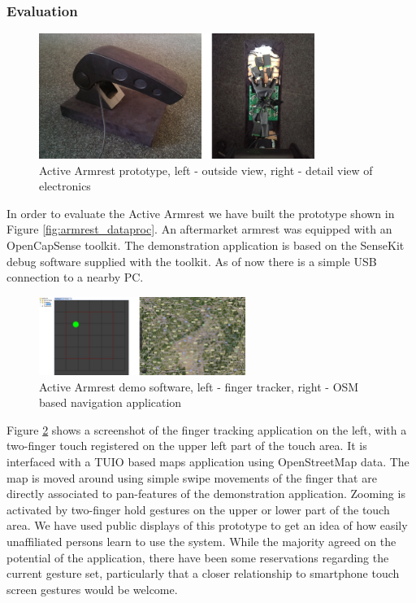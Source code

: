 \subsubsection{Evaluation}
\begin{figure}[h]
\centering
\includegraphics[width=0.8\textwidth]{images/armrest_proto}
\caption{Active Armrest prototype, left - outside view, right - detail view of electronics}
\label{fig:armrest_proto}
\end{figure}
In order to evaluate the Active Armrest we have built the prototype shown in Figure \ref{fig:armrest_dataproc}. An aftermarket armrest was equipped with an OpenCapSense toolkit. The demonstration application is based on the SenseKit debug software supplied with the toolkit. As of now there is a simple USB connection to a nearby PC.
\begin{figure}[h]
\centering
\includegraphics[width=0.6\textwidth]{images/armrest_eval}
\caption{Active Armrest demo software, left - finger tracker, right - OSM based navigation application}
\label{fig:armrest_eval}
\end{figure}
Figure \ref{fig:armrest_eval} shows a screenshot of the finger tracking application on the left, with a two-finger touch registered on the upper left part of the touch area. It is interfaced with a TUIO \cite{kaltenbrunner2005tuio} based maps application using OpenStreetMap \cite{haklay2008openstreetmap} data. The map is moved around using simple swipe movements of the finger that are directly associated to pan-features of the demonstration application. Zooming is activated by two-finger hold gestures on the upper or lower part of the touch area. We have used public displays of this prototype to get an idea of how easily unaffiliated persons learn to use the system. While the majority agreed on the potential of the application, there have been some reservations regarding the current gesture set, particularly that a closer relationship to smartphone touch screen gestures would be welcome.
